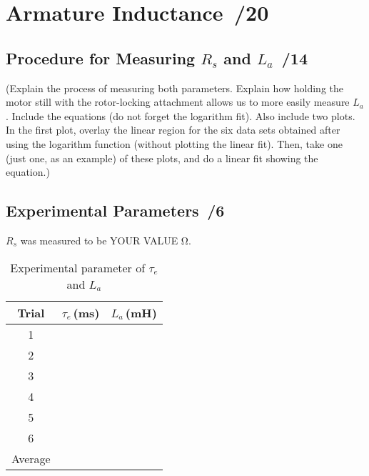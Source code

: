 \documentclass{article}
\newcommand{\score}{\hfill \underline{\hspace{0.65cm}}\,/} %
\begin{document}
\section{Armature Inductance \score 20}
\subsection{Procedure for Measuring $R_s$ and $L_a$ \score 14}
(Explain the process of measuring both parameters. Explain how holding the motor still with the rotor-locking attachment allows us to more easily measure $L_a$. Include the equations (do not forget the logarithm fit). 
Also include two plots. In the first plot, overlay the linear region for the six data sets obtained after using the logarithm function (without plotting the linear fit). Then, take one (just one, as an example) of these plots, and do a linear fit showing the equation.)


\subsection{Experimental Parameters \score 6}
$R_s$ was measured to be YOUR VALUE \si{\ohm}.
\begin{table}[phtb] \label{tbl:lab4_q4}
\begin{center}
\caption{Experimental parameter of $\tau_e$ and $L_a$}
\begin{tabular}{c|r|r} \hline \hline
\cellcolor{lightgray} Trial & \cellcolor{lightgray} $\tau_e$\,(\si{\milli\second}) & \cellcolor{lightgray} $L_a$\,(\si{\milli\henry}) \\
\hline
1 &  &  \\ \hline
2 &  &  \\ \hline
3 &  &  \\ \hline
4 &  &  \\ \hline
5 &  &  \\ \hline
6 &  &  \\ \hline
Average &  & \\\hline
\end{tabular}
\end{center}
\end{table}
\end{document}
